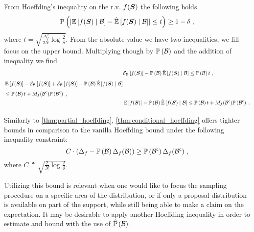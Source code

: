 \begin{proofE}
	From Hoeffding's inequality on the r.v. $f(\boldsymbol S)$ the following holds
	\begin{equation*}
		\mathrm{P}\left({\lvert\operatorname*{\mathbb{E}}\limits_{}\left[{f(\boldsymbol S)}\mid{\ensuremath{\mathcal B}}\right]-\operatorname*{\hat{\operatorname*{\mathbb{E}}}}\limits_{}\left[{f(\boldsymbol S)}\mid{\ensuremath{\mathcal B}}\right]\rvert\leq t}\right)\geq1-\delta\;,
	\end{equation*}
	where $t=\sqrt{\frac{\Delta_f^2}{2N}\log\frac{2}{\delta}}$. From the absolute value we have two inequalities, we fill focus on the upper bound.
	Multiplying though by $\mathbb{P}\left({\mathcal B}\right)$ and the addition of inequality  we find
	\begin{align*}
		& \mathcal{E}_{\mathcal B}\left[{f(\boldsymbol S)}\right]-\mathbb{P}\left({\mathcal B}\right)\operatorname*{\hat{\operatorname*{\mathbb{E}}}}\limits_{}\left[{f(\boldsymbol S)}\mid{\ensuremath{\mathcal B}}\right]\leq \mathbb{P}\left({\mathcal B}\right)t\;,\\
		\begin{split}
			& \operatorname*{\mathbb{E}}\limits_{}\left[{f(\boldsymbol S)}\right]-\mathcal{E}_{\mathcal B}\left[{f(\boldsymbol S)}\right]+\mathcal{E}_{\mathcal B}\left[{f(\boldsymbol S)}\right]-\mathbb{P}\left({\mathcal B}\right)\operatorname*{\hat{\operatorname*{\mathbb{E}}}}\limits_{}\left[{f(\boldsymbol S)}\mid{\ensuremath{\mathcal B}}\right] \\
			& \leq \mathbb{P}\left({\mathcal B}\right)t+M_f({\mathcal B}^{\mathsf{c}})\mathbb{P}\left({{\mathcal B}^{\mathsf{c}}}\right)\;,
		\end{split} \\
		& \operatorname*{\mathbb{E}}\limits_{}\left[{f(\boldsymbol S)}\right]-\mathbb{P}\left({\mathcal B}\right)\operatorname*{\hat{\operatorname*{\mathbb{E}}}}\limits_{}\left[{f(\boldsymbol S)}\mid{\ensuremath{\mathcal B}}\right]\leq\mathbb{P}\left({\mathcal B}\right)t+M_f({\mathcal B}^{\mathsf{c}})\mathbb{P}\left({{\mathcal B}^{\mathsf{c}}}\right)\;.
	\end{align*}
\end{proofE}

\noindent Similarly to \cref{thm:partial_hoeffding}, \cref{thm:conditional_hoeffding} offers tighter bounds in comparison to the vanilla Hoeffding bound under the following inequality constraint:
\begin{equation}
	C\cdot\left(\Delta_f-\mathbb{P}\left({\mathcal B}\right)\Delta_f(\mathcal B)\right)\geq \mathbb{P}\left({{\mathcal B}^{\mathsf{c}}}\right)\Delta_f({\mathcal B}^{\mathsf{c}})\;,
\end{equation}
where $C\triangleq\sqrt{\frac{2}{N}\log\frac{2}{\delta}}$.

Utilizing this bound is relevant when one would like to focus the sampling procedure on a specific area of the distribution, or if only a proposal distribution is available on part of the support, while still being able to make a claim on the expectation. It may be desirable to apply another Hoeffding inequality in order to estimate and bound with the use of $\hat{\mathbb{P}}\left({\mathcal B}\right)$.

